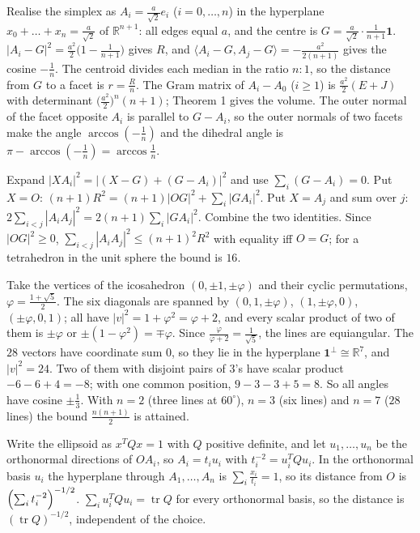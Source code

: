 \documentclass[11pt,a4paper]{article}
\begin{document}

 Realise the simplex as $A_i=\frac a{\sqrt2}e_i$ ($i=0,\dots,n$) in the hyperplane $x_0+\dots+x_n=\frac a{\sqrt2}$ of $\mathbb R^{n+1}$: all edges equal $a$, and the centre is $G=\frac a{\sqrt2}\cdot\frac1{n+1}\mathbf1$.
 $|A_i-G|^2=\frac{a^2}2\bigl(1-\frac1{n+1}\bigr)$ gives $R$, and $\langle A_i-G,A_j-G\rangle=-\frac{a^2}{2(n+1)}$ gives the cosine $-\frac1n$. The centroid divides each median in the ratio $n:1$, so the distance from $G$ to a facet is $r=\frac Rn$.
 The Gram matrix of $A_i-A_0$ ($i\ge1$) is $\frac{a^2}2(E+J)$ with determinant $\bigl(\frac{a^2}2\bigr)^n(n+1)$; Theorem 1 gives the volume. The outer normal of the facet opposite $A_i$ is parallel to $G-A_i$, so the outer normals of two facets make the angle $\arccos(-\frac1n)$ and the dihedral angle is $\pi-\arccos(-\frac1n)=\arccos\frac1n$.

 Expand $|XA_i|^2=|(X-G)+(G-A_i)|^2$ and use $\sum_i(G-A_i)=0$.
 Put $X=O$: $(n+1)R^2=(n+1)|OG|^2+\sum_i|GA_i|^2$. Put $X=A_j$ and sum over $j$: $2\sum_{i<j}|A_iA_j|^2=2(n+1)\sum_i|GA_i|^2$.
 Combine the two identities. Since $|OG|^2\ge0$, $\sum_{i<j}|A_iA_j|^2\le(n+1)^2R^2$ with equality iff $O=G$; for a tetrahedron in the unit sphere the bound is $16$.

 Take the vertices of the icosahedron $(0,\pm1,\pm\varphi)$ and their cyclic permutations, $\varphi=\frac{1+\sqrt5}2$. The six diagonals are spanned by $(0,1,\pm\varphi)$, $(1,\pm\varphi,0)$, $(\pm\varphi,0,1)$; all have $|v|^2=1+\varphi^2=\varphi+2$, and every scalar product of two of them is $\pm\varphi$ or $\pm(1-\varphi^2)=\mp\varphi$. Since $\frac{\varphi}{\varphi+2}=\frac1{\sqrt5}$, the lines are equiangular.
 The $28$ vectors have coordinate sum $0$, so they lie in the hyperplane $\mathbf1^\perp\cong\mathbb R^7$, and $|v|^2=24$. Two of them with disjoint pairs of $3$'s have scalar product $-6-6+4=-8$; with one common position, $9-3-3+5=8$. So all angles have cosine $\pm\frac13$.
 With $n=2$ (three lines at $60^\circ$), $n=3$ (six lines) and $n=7$ ($28$ lines) the bound $\frac{n(n+1)}2$ is attained.

 Write the ellipsoid as $x^TQx=1$ with $Q$ positive definite, and let $u_1,\dots,u_n$ be the orthonormal directions of $OA_i$, so $A_i=t_iu_i$ with $t_i^{-2}=u_i^TQu_i$.
 In the orthonormal basis $u_i$ the hyperplane through $A_1,\dots,A_n$ is $\sum_i\frac{x_i}{t_i}=1$, so its distance from $O$ is $\Bigl(\sum_i t_i^{-2}\Bigr)^{-1/2}$.
 $\sum_iu_i^TQu_i=\operatorname{tr}Q$ for every orthonormal basis, so the distance is $(\operatorname{tr}Q)^{-1/2}$, independent of the choice.
\end{document}
